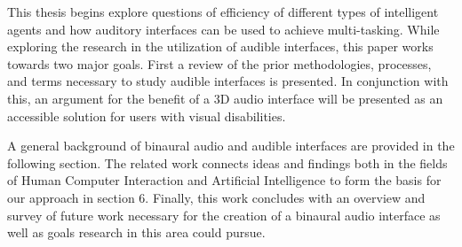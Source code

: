 This thesis begins explore questions of efficiency of different types of intelligent
agents and how auditory interfaces can be used to achieve multi-tasking. While
exploring the research in the utilization of audible interfaces, this paper works
towards two major goals. First a review of the prior methodologies, processes, and
terms necessary to study audible interfaces is presented. In conjunction with this,
an argument for the benefit of a 3D audio interface will be presented as an 
accessible solution for users with visual disabilities.


A general background of binaural audio and audible interfaces are provided in 
the following section. The related work connects ideas and findings both in the
fields of Human Computer Interaction and Artificial Intelligence to form the 
basis for our approach in section 6. Finally, this work concludes with an
overview and survey of future work necessary for the creation of a binaural 
audio interface as well as goals research in this area could pursue.
